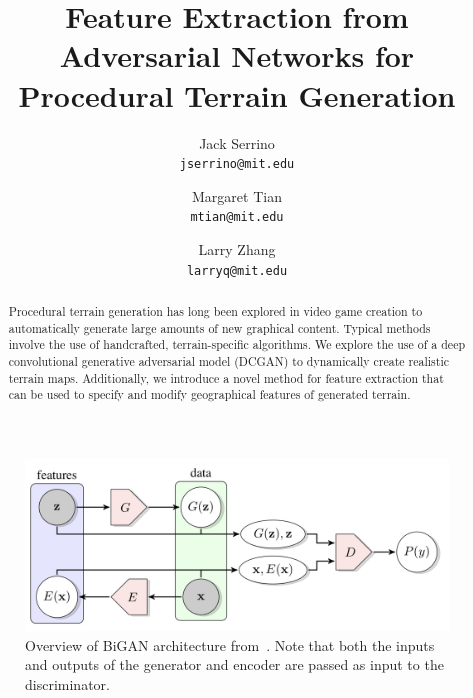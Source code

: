 \documentclass[11pt,twocolumn,letterpaper]{article}
\begin{document}
\title{Feature Extraction from Adversarial Networks for Procedural Terrain Generation}

\author{Jack Serrino\\
{\tt\small jserrino@mit.edu}
\and
Margaret Tian\\
{\tt\small mtian@mit.edu}
\and
Larry Zhang\\
{\tt\small larryq@mit.edu}
}

\maketitle

\begin{abstract}
    Procedural terrain generation has long been explored in video game creation to automatically generate large amounts of new graphical content. Typical methods involve the use of handcrafted, terrain-specific algorithms. We explore the use of a deep convolutional generative adversarial model (DCGAN) to dynamically create realistic terrain maps. Additionally, we introduce a novel method for feature extraction that can be used to specify and modify geographical features of generated terrain.\\
\end{abstract}

\begin{figure}[ht]
    \centering
    \includegraphics[width=0.9\linewidth]{imgs/bigan.png}
    \caption{Overview of BiGAN architecture from~\cite{bigan}. Note that both the inputs and outputs of the generator and encoder are passed as input to the discriminator.}
  \label{fig:bigan}
\end{figure}
\end{document}
